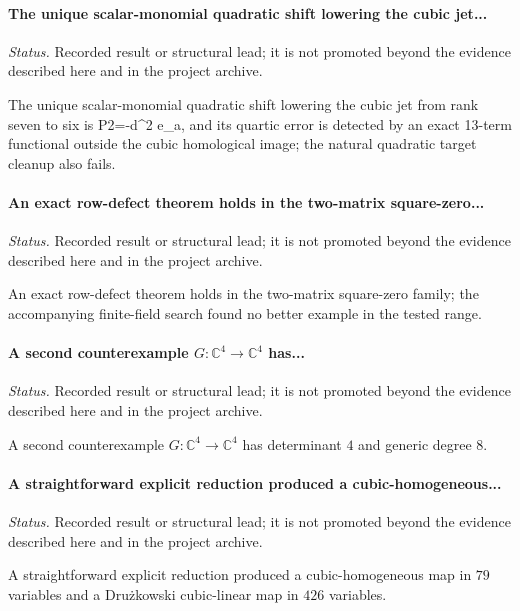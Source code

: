 \label{supp-note-05-011}
\paragraph{The unique scalar-monomial quadratic shift lowering the cubic jet...}
\emph{Status.} Recorded result or structural lead; it is not promoted beyond the evidence described here and in the project archive.

The unique scalar-monomial quadratic shift lowering the cubic jet from rank seven to six is P2=-d\textasciicircum{}2 e\_a, and its quartic error is detected by an exact 13-term functional outside the cubic homological image; the natural quadratic target cleanup also fails.

\label{supp-note-05-012}
\paragraph{An exact row-defect theorem holds in the two-matrix square-zero...}
\emph{Status.} Recorded result or structural lead; it is not promoted beyond the evidence described here and in the project archive.

An exact row-defect theorem holds in the two-matrix square-zero family; the accompanying finite-field search found no better example in the tested range.

\label{supp-note-05-013}
\paragraph{A second counterexample \(G:\mathbb C^4\to\mathbb C^4\) has...}
\emph{Status.} Recorded result or structural lead; it is not promoted beyond the evidence described here and in the project archive.

A second counterexample \(G:\mathbb C^4\to\mathbb C^4\) has determinant \(4\) and generic degree \(8\).

\label{supp-note-05-014}
\paragraph{A straightforward explicit reduction produced a cubic-homogeneous...}
\emph{Status.} Recorded result or structural lead; it is not promoted beyond the evidence described here and in the project archive.

A straightforward explicit reduction produced a cubic-homogeneous map in \(79\) variables and a Dru\.{z}kowski cubic-linear map in \(426\) variables.

